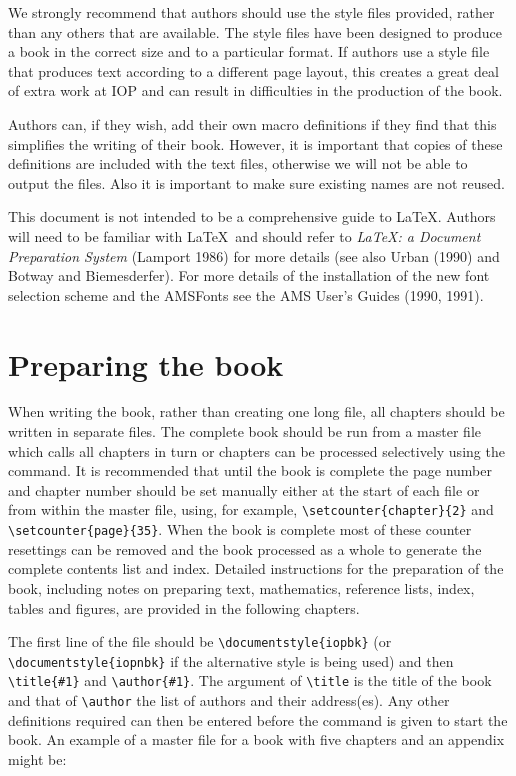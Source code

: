 We strongly recommend that authors should use the style 
files 
provided, rather than any others 
that are available. The style files have been designed to produce 
a book in the correct size and to a particular format. If authors use a 
style file that produces text according to a different page layout, 
this creates a great deal of extra work at IOP and can result in 
difficulties in the production of the book.

Authors can, if they wish, add their own macro definitions if they 
find that this simplifies the writing of their book. 
However, it is 
important that copies of these definitions are included with the text 
files, otherwise we will not be able to output the files. Also it is 
important to make sure existing names are not reused.


This document is not intended to be a comprehensive guide to \LaTeX. 
Authors will need to be familiar with \LaTeX\ and should 
refer to {\em \LaTeX: a Document Preparation System\/} (Lamport 1986) 
for more details (see also Urban (1990) and Botway and Biemesderfer).
For more details of the installation of the new font selection scheme and
the AMSFonts see the AMS User's Guides (1990, 1991).

\section{Preparing the book}
When writing the book, rather than creating one long file, 
all chapters should be written in separate 
files. The complete book should be run from a master 
file which calls all chapters 
in turn or chapters can be processed selectively using the 
\verb"" command.
It is recommended that until the book is complete  
the page number and chapter number should be set manually 
either at the start of each file or from within the master file, 
using, for example, \verb"\setcounter{chapter}{2}" and
\verb"\setcounter{page}{35}". 
When the book is complete most of these
counter resettings can be removed and the book  processed as a whole
to generate the complete contents list and 
index.
Detailed instructions for the preparation of the book, including notes 
on preparing text, mathematics, reference lists, index, tables and figures, 
are provided in the following chapters.




The first line of the file should be \verb"\documentstyle{iopbk}"
(or \verb"\documentstyle{iopnbk}" if the alternative style is being used)
and then \verb"\title{#1}" and \verb"\author{#1}".
The argument of \verb"\title" is the title of the book 
and that of
\verb"\author" the list of authors  and their
address(es).
Any other definitions required can then be entered before the
\verb"" command is given to start the book.
An example of a master file for a book with five chapters and an appendix
might be:

